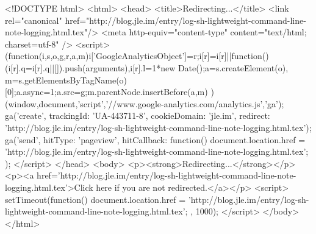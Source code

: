 <!DOCTYPE html>
<html>
<head>
<title>Redirecting...</title>
<link rel="canonical" href="http://blog.jle.im/entry/log-sh-lightweight-command-line-note-logging.html.tex"/>
<meta http-equiv="content-type" content="text/html; charset=utf-8" />
<script>
(function(i,s,o,g,r,a,m){i['GoogleAnalyticsObject']=r;i[r]=i[r]||function(){
(i[r].q=i[r].q||[]).push(arguments)},i[r].l=1*new Date();a=s.createElement(o),
m=s.getElementsByTagName(o)[0];a.async=1;a.src=g;m.parentNode.insertBefore(a,m)
})(window,document,'script','//www.google-analytics.com/analytics.js','ga');
ga('create', { trackingId: 'UA-443711-8', cookieDomain: 'jle.im', redirect: 'http://blog.jle.im/entry/log-sh-lightweight-command-line-note-logging.html.tex'});
ga('send', { hitType: 'pageview', hitCallback: function() { document.location.href = 'http://blog.jle.im/entry/log-sh-lightweight-command-line-note-logging.html.tex'; } });
</script>
</head>
<body>
  <p><strong>Redirecting...</strong></p>
  <p><a href='http://blog.jle.im/entry/log-sh-lightweight-command-line-note-logging.html.tex'>Click here if you are not redirected.</a></p>
  <script>
    setTimeout(function() { document.location.href = 'http://blog.jle.im/entry/log-sh-lightweight-command-line-note-logging.html.tex'; }, 1000);
  </script>
</body>
</html>
